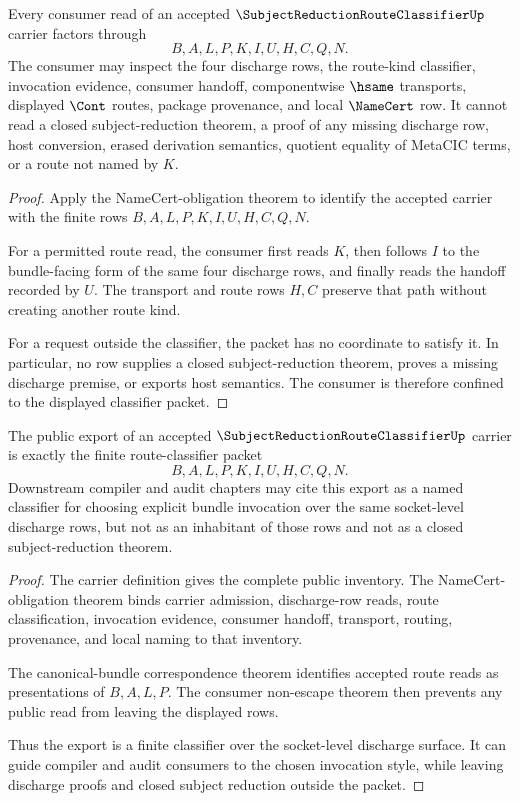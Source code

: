 \begin{theorem}
\label{thm:subject-reduction-route-classifier-consumer-nonescape}
Every consumer read of an accepted $\SubjectReductionRouteClassifierUp$ carrier factors through
$$
B,A,L,P,K,I,U,H,C,Q,N.
$$
The consumer may inspect the four discharge rows, the route-kind classifier, invocation evidence, consumer handoff, componentwise $\hsame$ transports, displayed $\Cont$ routes, package provenance, and local $\NameCert$ row. It cannot read a closed subject-reduction theorem, a proof of any missing discharge row, host conversion, erased derivation semantics, quotient equality of MetaCIC terms, or a route not named by $K$.
\end{theorem}
\begin{proof}
Apply the NameCert-obligation theorem to identify the accepted carrier with the finite rows $B,A,L,P,K,I,U,H,C,Q,N$.

For a permitted route read, the consumer first reads $K$, then follows $I$ to the bundle-facing form of the same four discharge rows, and finally reads the handoff recorded by $U$. The transport and route rows $H,C$ preserve that path without creating another route kind.

For a request outside the classifier, the packet has no coordinate to satisfy it. In particular, no row supplies a closed subject-reduction theorem, proves a missing discharge premise, or exports host semantics. The consumer is therefore confined to the displayed classifier packet.
\end{proof}

\begin{theorem}
\label{thm:subject-reduction-route-classifier-public-export}
The public export of an accepted $\SubjectReductionRouteClassifierUp$ carrier is exactly the finite route-classifier packet
$$
B,A,L,P,K,I,U,H,C,Q,N.
$$
Downstream compiler and audit chapters may cite this export as a named classifier for choosing explicit bundle invocation over the same socket-level discharge rows, but not as an inhabitant of those rows and not as a closed subject-reduction theorem.
\end{theorem}
\begin{proof}
The carrier definition gives the complete public inventory. The NameCert-obligation theorem binds carrier admission, discharge-row reads, route classification, invocation evidence, consumer handoff, transport, routing, provenance, and local naming to that inventory.

The canonical-bundle correspondence theorem identifies accepted route reads as presentations of $B,A,L,P$. The consumer non-escape theorem then prevents any public read from leaving the displayed rows.

Thus the export is a finite classifier over the socket-level discharge surface. It can guide compiler and audit consumers to the chosen invocation style, while leaving discharge proofs and closed subject reduction outside the packet.
\end{proof}

